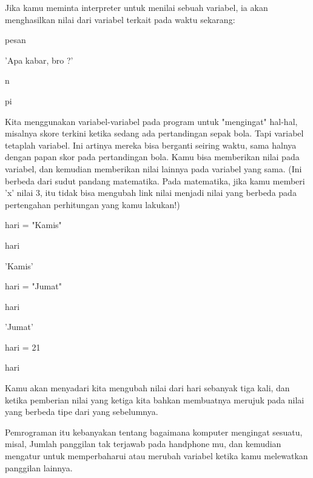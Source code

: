 \vspace{12pt}
\vspace{12pt}
\vspace{12pt}
\vspace{12pt}
\noindent 
Jika kamu meminta interpreter untuk menilai sebuah variabel, ia akan menghasilkan nilai dari variabel terkait pada waktu sekarang: \par
\vspace{12pt}
\noindent 
pesan \par
\noindent 
'Apa kabar, bro ?' \par
\noindent 
n \par
{} \par
\noindent 
pi \par
{} \par
\vspace{12pt}
\noindent 
Kita menggunakan variabel-variabel pada program untuk "mengingat" hal-hal, misalnya skore terkini ketika sedang ada pertandingan sepak bola. Tapi variabel tetaplah $  $variabel. Ini artinya mereka bisa berganti seiring waktu, sama halnya dengan papan skor pada pertandingan bola. Kamu bisa memberikan nilai pada variabel, dan kemudian memberikan nilai lainnya pada variabel yang sama. (Ini berbeda dari sudut pandang matematika. Pada matematika, jika kamu memberi 'x' nilai 3, itu tidak bisa mengubah link nilai menjadi nilai yang berbeda pada pertengahan perhitungan yang kamu lakukan!) \par
\vspace{12pt}
\noindent 
hari = "Kamis" \par
\noindent 
hari \par
\noindent 
'Kamis' \par
\noindent 
hari = "Jumat" \par
\noindent 
hari \par
\noindent 
'Jumat' \par
\noindent 
hari = 21 \par
\noindent 
hari \par
{} \par
\vspace{12pt}
\noindent 
Kamu akan menyadari kita mengubah nilai dari $  $hari $  $sebanyak tiga kali, dan ketika pemberian nilai yang ketiga kita bahkan membuatnya merujuk pada nilai yang berbeda tipe dari yang sebelumnya. \par
\vspace{12pt}
\noindent 
Pemrograman itu kebanyakan tentang bagaimana komputer mengingat sesuatu, misal, $  $Jumlah panggilan tak terjawab pada handphone mu, $  $dan kemudian mengatur untuk memperbaharui atau merubah variabel ketika kamu melewatkan panggilan lainnya. \par
